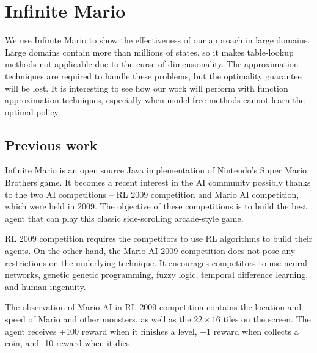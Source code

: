 \vfill
\clearpage





\section{Infinite Mario}
\label{se:MarioExp}
We use Infinite Mario to show the effectiveness of our approach in large domains. 
Large domains contain more than millions of states, so it makes table-lookup methods not applicable
due to the curse of dimensionality. The approximation techniques are required to handle these
problems, but the optimality guarantee will be lost.
It is interesting to see how our work will perform with function approximation techniques,
especially when model-free methods cannot learn the optimal policy.

\subsection{Previous work}
Infinite Mario is an open source Java implementation of Nintendo's Super Mario Brothers game.
It becomes a recent interest in the AI community possibly thanks to
the two AI competitions -- RL 2009 competition and Mario AI competition, which were held in 2009.
The objective of these competitions is to build the best agent that
can play this classic side-scrolling arcade-style game.

RL 2009 competition requires the competitors to use RL algorithms to build their agents.
On the other hand, the Mario AI 2009 competition \cite{Robin09} 
does not pose any restrictions on the underlying technique.
It encourages
competitors to use neural networks, genetic genetic programming, fuzzy logic, temporal difference learning, and human ingenuity.

The observation of Mario AI in RL 2009 competition 
contains the location and speed of Mario and other monsters, as well as
the $22 \times 16$ tiles on the screen.
The agent receives +100 reward when it finishes a level, +1 reward when collects
a coin, and -10 reward when it dies.

